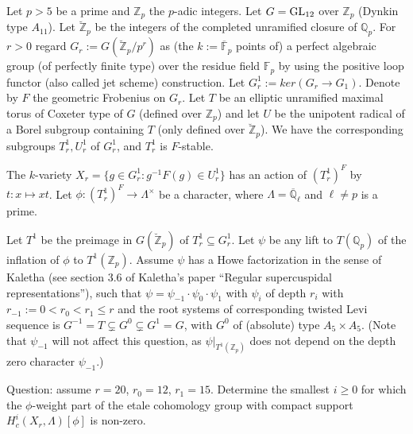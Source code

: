 Let $p>5$ be a prime and $\mathbb{Z}_p$ the $p$-adic integers. Let $G = {\rm GL}_{12}$ over $\mathbb{Z}_p$ (Dynkin type $A_{11}$). Let $\breve{\mathbb{Z}}_p$ be the integers of the completed unramified closure of $\mathbb{Q}_p$. For $r > 0$ regard $G_r :=G(\breve{\mathbb{Z}}_p/p^r)$ as (the $k:=\overline{\mathbb{F}}_p$ points of) a perfect algebraic group (of perfectly finite type) over the residue field $\mathbb{F}_p$ by using the positive loop functor (also called jet scheme) construction. Let $G_r^1:=ker(G_r \to G_1)$. Denote by $F$ the geometric Frobenius on $G_r$. Let $T$ be an elliptic unramified maximal torus of Coxeter type of $G$ (defined over $\mathbb{Z}_p$) and let $U$ be the unipotent radical of a Borel subgroup containing $T$ (only defined over $\breve{\mathbb{Z}}_p$). We have the corresponding subgroups $T_r^1,U_r^1$ of $G_r^1$, and $T_r^1$ is $F$-stable.

The $k$-variety $X_r = \{g \in G^1_r \colon g^{-1}F(g) \in U^1_r\}$ has an action of $(T^1_r)^F$ by $t : x \mapsto xt$. Let $\phi : (T_r^1)^F \to \Lambda^\times$ be a character, where $\Lambda=\overline{\mathbb{Q}}_\ell$ and $\ell\neq p$ is a prime.

Let $T^1$ be the preimage in $G(\breve{\mathbb{Z}}_p)$ of $T_r^1 \subseteq G_r^1$. Let $\psi$ be any lift to $T(\mathbb{Q}_p)$ of the inflation of $\phi$ to $T^1(\mathbb{Z}_p)$. Assume $\psi$ has a Howe factorization in the sense of Kaletha (see section 3.6 of Kaletha's paper ``Regular supercuspidal representations''), such that $\psi=\psi_{-1}\cdot\psi_0\cdot \psi_1$ with $\psi_i$ of depth $r_i$ with $r_{-1}:=0<r_0<r_1 \leq r$ and the root systems of corresponding twisted Levi sequence is $G^{-1} = T \subsetneq G^0 \subsetneq G^1 = G$, with $G^0$ of (absolute) type $A_5 \times A_5$. (Note that $\psi_{-1}$ will not affect this question, as $\psi|_{T^1(\mathbb{Z}_p)}$ does not depend on the depth zero character $\psi_{-1}$.)

Question: assume $r=20$, $r_0=12$, $r_1=15$. Determine the smallest $i \geq 0$ for which the $\phi$-weight part of the etale cohomology group with compact support $H_c^i(X_r,\Lambda)[\phi]$ is non-zero.
